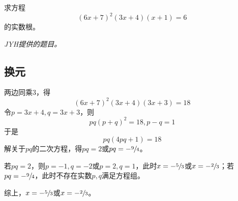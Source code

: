 

求方程
\[ (6x + 7)^2(3x + 4)(x + 1) = 6 \]
的实数根。

\textit{JYH提供的题目。}


\subsection{换元}

两边同乘3，得
\[ (6x + 7)^2(3x + 4)(3x + 3) = 18 \]
令$p = 3x + 4, q = 3x + 3$，则
\[ pq(p + q)^2 = 18, p - q = 1 \]
于是
\[ pq(4pq + 1) = 18 \]
解关于$pq$的二次方程，得$pq = 2$或$pq = -\sfrac94$。

若$pq = 2$，则$p = -1, q = -2$或$p = 2, q = 1$，此时$x = -\sfrac53$或$x = -\sfrac23$；若$pq = -\sfrac94$，此时不存在实数$p, q$满足方程组。

综上，$x = -\sfrac53$或$x = -\sfrac23$。
